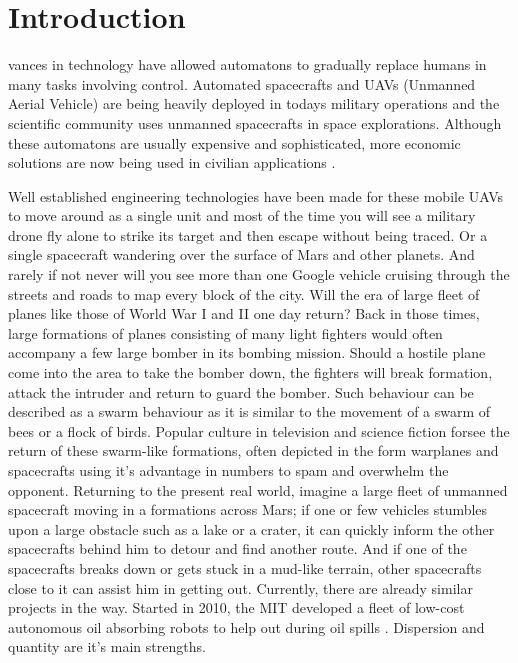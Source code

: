 \documentclass[journal]{IEEEtran}
\begin{document}
\section{Introduction}
vances in technology have allowed automatons to gradually replace humans in many tasks involving control. Automated spacecrafts and UAVs (Unmanned Aerial Vehicle) are being heavily deployed in todays military operations and the scientific
community uses unmanned spacecrafts in space explorations. Although these automatons are usually expensive and sophisticated, more economic solutions are now being used in civilian applications \cite{YS1}.

Well established engineering technologies have been made for these mobile UAVs to move around as a single unit and most of the time you will see a military drone fly alone to strike its target and then escape without being traced.
Or a single spacecraft wandering over the surface of Mars and other planets. And rarely if not never will you see more than one Google vehicle cruising through the streets and roads to map every block of the city. Will the era of large fleet of planes like those of World War I and II one day return? Back in those times, large formations of planes consisting of many light fighters would often accompany a few large bomber in its bombing mission. Should a hostile plane come into the area to take the bomber down, the fighters will break formation, attack the intruder and return to guard the bomber. Such behaviour can be described as a swarm behaviour as it is similar to the movement of a swarm of bees or a flock of birds. Popular culture \cite{YS2} in television and science fiction forsee the return of these swarm-like formations, often depicted in the form warplanes and spacecrafts using it's advantage in numbers to spam and overwhelm the opponent. Returning to the present real world, imagine a large fleet of unmanned spacecraft moving in a formations across Mars; if one or few vehicles stumbles upon a large obstacle such as a lake or a crater, it can quickly inform the other spacecrafts behind him to detour and find another route. And if one of the spacecrafts breaks down or gets stuck in a mud-like terrain, other spacecrafts close to it can assist him in getting out. Currently, there are already similar projects in the way. Started in 2010, the MIT developed a fleet of low-cost autonomous oil absorbing robots to help out during oil spills \cite{YS3.5}\cite{YS3.6}. Dispersion and quantity are it's main strengths. 
\end{document}

